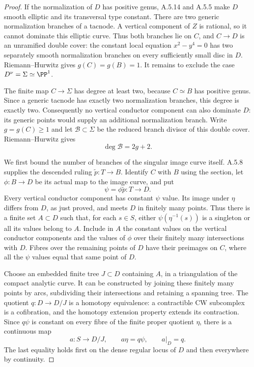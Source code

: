 \begin{proof}
If the normalization of $D$ has positive genus, A.5.14
and A.5.5 make $D$ smooth elliptic and its transversal
type constant. There are two generic normalization
branches of a tacnode. A vertical component of $Z$
is rational, so it cannot dominate this elliptic curve.
Thus both branches lie on $C$, and $C\to D$ is an
unramified double cover: the constant local equation
$x^2-y^4=0$ has two separately smooth normalization
branches on every sufficiently small disc in $D$.
Riemann--Hurwitz gives $g(C)=g(B)=1$.
It remains to exclude the case $D^\nu=\Sigma\simeq\PP^1$.

The finite map $C\to\Sigma$ has degree at least two,
because $C\simeq B$ has positive genus. Since a generic
tacnode has exactly two normalization branches, this
degree is exactly two. Consequently no vertical
conductor component can also dominate $D$: its generic
points would supply an additional normalization branch.
Write $g=g(C)\ge1$ and let $\mathcal B\subset\Sigma$
be the reduced branch divisor of this double cover.
Riemann--Hurwitz gives
\[
                   \deg\mathcal B=2g+2.             \tag{A.T.1}
\]

We first bound the number of branches of the singular
image curve itself. A.5.8 supplies the descended ruling
$\widetilde p:T\to B$. Identify $C$ with $B$ using the
section, let $\phi:B\to D$ be its actual map to the
image curve, and put
\[
                    \psi=\phi\widetilde p:T\to D.
\]
Every vertical conductor component has constant $\psi$
value. Its image under $\eta$ differs from $D$, as just
proved, and meets $D$ in finitely many points. Thus
there is a finite set $A\subset D$ such that, for each
$s\in S$, either $\psi(\eta^{-1}(s))$ is a singleton
or all its values belong to $A$. Include in $A$ the
constant values on the vertical conductor components
and the values of $\phi$ over their finitely many
intersections with $D$. Fibres over the remaining
points of $D$ have their preimages on $C$, where all
the $\psi$ values equal that same point of $D$.

Choose an embedded finite tree $J\subset D$ containing
$A$, in a triangulation of the compact analytic curve.
It can be constructed by joining these finitely many
points by arcs, subdividing their intersections and
retaining a spanning tree. The quotient
$q:D\to D/J$ is a homotopy equivalence: a contractible
CW subcomplex is a cofibration, and the homotopy
extension property extends its contraction. Since
$q\psi$ is constant on every fibre of the finite
proper quotient $\eta$, there is a continuous map
\[
 a:S\to D/J,\qquad a\eta=q\psi,\qquad a|_D=q.     \tag{A.T.2}
\]
The last equality holds first on the dense regular
locus of $D$ and then everywhere by continuity.


\end{proof}
